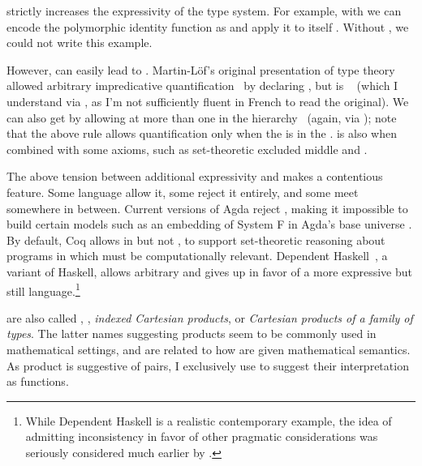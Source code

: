 {  strictly increases the
expressivity of the type system.
For example, with  we can encode the polymorphic identity
function as \im{\sf : \spity{\salpha}{\spropty}{\sfunty{\salpha}{\salpha}}} and
apply it to itself
\im{(\sappe{\sf}{(\spity{\salpha}{\spropty}{\sfunty{\salpha}{\salpha}})~\sf}) :
    \spity{\salpha}{\spropty}{\sfunty{\salpha}{\salpha}}}.
Without , we could not write this example.

However,  can easily lead to .
Martin-L\"of's original presentation of type theory allowed arbitrary
impredicative quantification~\cite{martin-loef1971} by declaring \im{\spropty :
  \spropty}, but is ~\cite{girard1972} (which I understand
via \citet{coquand1986}, as I'm not sufficiently fluent in French to read the
original).
We can also get  by allowing  at more
than one  in the hierarchy~\cite{girard1972} (again, via
\citet{coquand1986}); note that the above  rule allows
 quantification only when the  is
in the  \im{\spropty}.
 is also  when combined with some
axioms, such as set-theoretic excluded middle and .

The above tension between additional expressivity and  makes
 a contentious feature.
Some  language allow it, some reject it entirely, and
some meet somewhere in between.
Current versions of Agda reject , making it impossible to
build certain models such as an embedding of  System F in
Agda's base universe \im{\ssetty}.
By default, Coq allows  in \im{\spropty} but not
\im{\ssetty}, to support set-theoretic reasoning about programs in \im{\ssetty}
which must be computationally relevant.
Dependent Haskell~\cite{weirich2017}, a  variant of
Haskell, allows arbitrary  and gives up  in favor of a more expressive but still 
language.\footnote{While Dependent Haskell is a realistic contemporary example,
  the idea of admitting inconsistency in favor of other pragmatic considerations
  was seriously considered much earlier by \citet{cardelli1986}.}

\begin{digression}
 are also called ,
,
\emph{indexed Cartesian products}, or \emph{Cartesian products of a family of
  types}.
The latter names suggesting products seem to be commonly used in mathematical
settings, and are related to how  are given
mathematical semantics.
As product is suggestive of pairs, I exclusively use 
to suggest their interpretation as functions.


\end{digression}}
